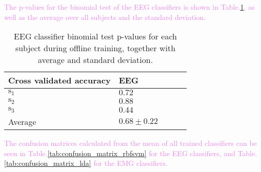 \textcolor{violet}{The p-values for the binomial test of the EEG classifiers is shown in Table.\:\ref{tab:classifier_test_binomial}, as well as the average over all subjects and the standard deviation.}
\begin{table}[ht]
	\centering
	\begin{tabular}{|l|l|l|l|l|}
			\hline
			Cross validated accuracy         & EEG                     \\
			\hline
			$\text{s}_1$                     & $0.72$                  \\
			$\text{s}_2$                     & $0.88$                  \\
			$\text{s}_3$                     & $0.44$                  \\
			Average                          & $0.68 \pm 0.22$         \\
			\hline
		\end{tabular}
	\caption{EEG classifier binomial test p-values for each subject during offline training, together with average and standard deviation.}
	\label{tab:classifier_test_binomial}
\end{table}

\textcolor{violet}{The confusion matrices calculated from the mean of all trained classifiers can be seen in Table.\:\ref{tab:confusion_matrix_rbfsvm} for the EEG classifiers, and Table.\:\ref{tab:confusion_matrix_lda} for the EMG classifiers.}
\def\colorModel{hsb} %

